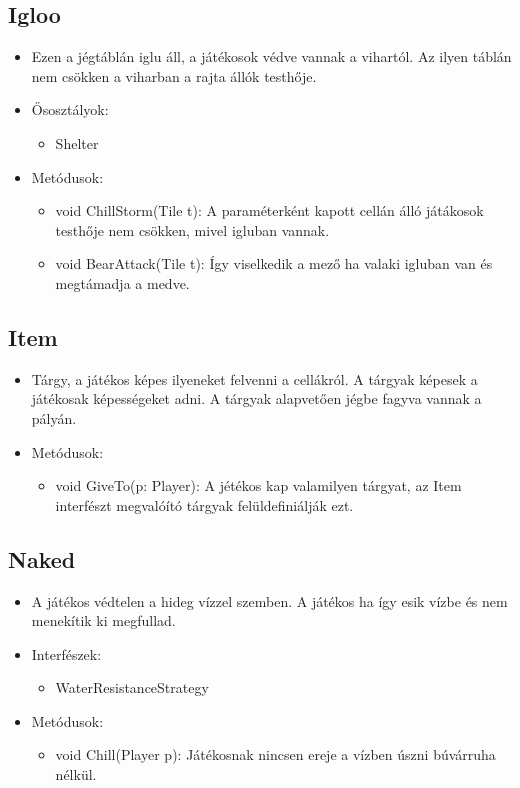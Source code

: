 \subsection{Igloo}
\begin{itemize}
	\item Ezen a jégtáblán iglu áll, a játékosok védve vannak a vihartól. Az ilyen táblán nem csökken a viharban a rajta állók testhője.
	\item Ősosztályok:
	\begin{itemize} 
		\item Shelter
	\end{itemize}
	\item Metódusok:
	\begin{itemize}
		\item void ChillStorm(Tile t): A paraméterként kapott cellán álló játákosok testhője nem csökken, mivel igluban vannak.
		\item void BearAttack(Tile t): Így viselkedik a mező ha valaki igluban van és megtámadja a medve.
	\end{itemize}
\end{itemize}

\subsection{Item}
\begin{itemize}
	\item Tárgy, a játékos képes ilyeneket felvenni a cellákról. A tárgyak képesek a játékosak képességeket adni. A tárgyak alapvetően jégbe fagyva vannak a pályán.
	\item Metódusok:
	\begin{itemize}
		\item void GiveTo(p: Player): A jétékos kap valamilyen tárgyat, az Item interfészt megvalóító tárgyak felüldefiniálják ezt.
	\end{itemize}
\end{itemize}

\subsection{Naked}
\begin{itemize}
	\item A játékos védtelen a hideg vízzel szemben. A játékos ha így esik vízbe és nem menekítik ki megfullad.
	\item Interfészek:
	\begin{itemize}
		\item WaterResistanceStrategy
	\end{itemize}
	\item Metódusok:
	\begin{itemize}
		\item void Chill(Player p): Játékosnak nincsen ereje a vízben úszni búvárruha nélkül.
	\end{itemize}
\end{itemize}

